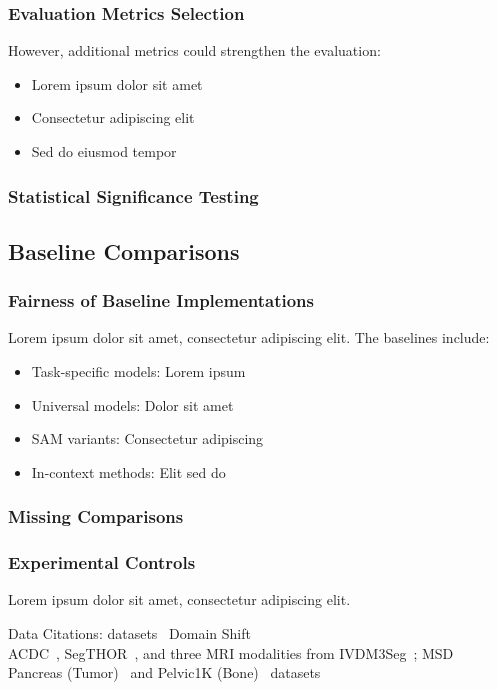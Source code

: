 \subsubsection{Evaluation Metrics Selection}
 However, additional metrics could strengthen the evaluation:
\begin{itemize}
    \item Lorem ipsum dolor sit amet
    \item Consectetur adipiscing elit
    \item Sed do eiusmod tempor
\end{itemize}

\subsubsection{Statistical Significance Testing}

\subsection{Baseline Comparisons}
\subsubsection{Fairness of Baseline Implementations}
Lorem ipsum dolor sit amet, consectetur adipiscing elit. The baselines include:
\begin{itemize}
    \item Task-specific models: Lorem ipsum
    \item Universal models: Dolor sit amet
    \item SAM variants: Consectetur adipiscing
    \item In-context methods: Elit sed do
\end{itemize}

\subsubsection{Missing Comparisons}

\subsubsection{Experimental Controls}
Lorem ipsum dolor sit amet, consectetur adipiscing elit. 

Data Citations:
datasets~\cite{bcv,bilic2019liver,heller2019kits19,ji2022amos,structseg,CHAOS2021,campello2021multi,rodrigue2012beta,gatidis2022whole,martin2023deep} 
Domain Shift\\
ACDC~\cite{bernard2018deep}, SegTHOR~\cite{lambert2020segthor}, and three MRI modalities from IVDM3Seg~\cite{ivdm3seg}; MSD Pancreas (Tumor)~\cite{antonelli2022medical} and Pelvic1K (Bone)~\cite{liu2021deep} datasets